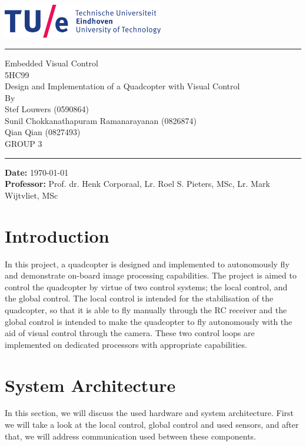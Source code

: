 \documentclass[11pt, a4paper, onecolumn, oneside, parskip=half]{scrartcl}
\newcommand{\authors}{\\Stef Louwers (0590864)\\
Sunil Chokkanathapuram Ramanarayanan (0826874)\\
Qian Qian (0827493)\\
GROUP 3
} %
\newcommand{\prof}{Prof. dr. Henk Corporaal, Lr. Roel S. Pieters, MSc, Lr. Mark Wijtvliet, MSc} %
\newcommand{\doctitle}{Design and Implementation of a Quadcopter with Visual Control} %
\newcommand{\subcode}{5HC99} %
\newcommand{\docsubject}{Embedded Visual Control} %
\newcommand{\HRule}[2]{\noindent\rule[#1]{\linewidth}{#2}}
\newcommand{\vlinespace}[1]{\vspace*{#1\baselineskip}}
\begin{document}
\begin{titlepage}

\sffamily
\hfill \centering
\includegraphics[width=7cm]{tuelogo}
\HRule{11pt}{2pt}

\vfill
\Large{\docsubject{} \\\subcode{} \\}
\vlinespace{1}
\huge{\doctitle{}\\}
\vlinespace{8}
\vfill
\large
By \authors{}\\
\vfill
\HRule{11pt}{2pt}
\raggedright
\textbf{Date: } \today \\
\textbf{Professor:} \prof{}

\end{titlepage}

\tableofcontents
\newpage
\pagestyle{scrheadings}

\section{Introduction}
In this project, a quadcopter is designed and implemented to autonomously fly and demonstrate on-board image processing capabilities. The project is aimed to control the quadcopter by virtue of two control systems; the local control, and the global control. The local control is intended for the stabilisation of the quadcopter, so that it is able to fly manually through the RC receiver and the global control is intended to make the quadcopter to fly autonomously with the aid of visual control through the camera. These two control loops are implemented on dedicated processors with appropriate capabilities.


\section{System Architecture}
In this section, we will discuss the used hardware and system architecture. First we will take a look at the local control, global control and used sensors, and after that, we will address communication used between these components.
\end{document}
